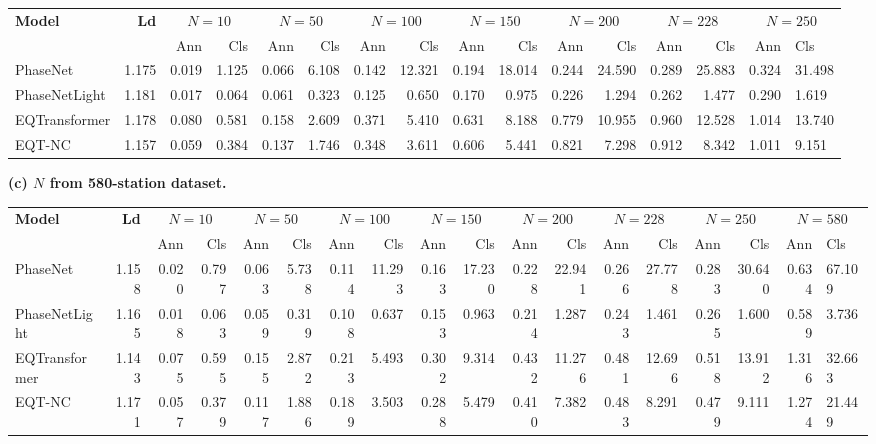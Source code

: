 \begin{landscape}
\begin{center}
\begin{tabular}{l r rrrrrrrrrrrrr}
\toprule
\textbf{Model} & \textbf{Ld} &  &  &  &  &  &  &  \\
 & & Ann & Cls & Ann & Cls & Ann & Cls & Ann & Cls & Ann & Cls & Ann & Cls & Ann & Cls \\
\midrule
PhaseNet & 1.175 & 0.019 & 1.125 & 0.066 & 6.108 & 0.142 & 12.321 & 0.194 & 18.014 & 0.244 & 24.590 & 0.289 & 25.883 & 0.324 & 31.498 \\
PhaseNetLight & 1.181 & 0.017 & 0.064 & 0.061 & 0.323 & 0.125 & 0.650 & 0.170 & 0.975 & 0.226 & 1.294 & 0.262 & 1.477 & 0.290 & 1.619 \\
EQTransformer & 1.178 & 0.080 & 0.581 & 0.158 & 2.609 & 0.371 & 5.410 & 0.631 & 8.188 & 0.779 & 10.955 & 0.960 & 12.528 & 1.014 & 13.740 \\
EQT-NC & 1.157 & 0.059 & 0.384 & 0.137 & 1.746 & 0.348 & 3.611 & 0.606 & 5.441 & 0.821 & 7.298 & 0.912 & 8.342 & 1.011 & 9.151 \\
\bottomrule
\end{tabular}

\vspace{1em}
\textbf{(c) \(N\) from 580-station dataset.}

\begin{tabular}{l r rrrrrrrrrrrrrrr}
\toprule
\textbf{Model} & \textbf{Ld} &  &  &  &  &  &  &  &  \\
 & & Ann & Cls & Ann & Cls & Ann & Cls & Ann & Cls & Ann & Cls & Ann & Cls & Ann & Cls & Ann & Cls \\
\midrule
PhaseNet & 1.158 & 0.020 & 0.797 & 0.063 & 5.738 & 0.114 & 11.293 & 0.163 & 17.230 & 0.228 & 22.941 & 0.266 & 27.778 & 0.283 & 30.640 & 0.634 & 67.109 \\
PhaseNetLight & 1.165 & 0.018 & 0.063 & 0.059 & 0.319 & 0.108 & 0.637 & 0.153 & 0.963 & 0.214 & 1.287 & 0.243 & 1.461 & 0.265 & 1.600 & 0.589 & 3.736 \\
EQTransformer & 1.143 & 0.075 & 0.595 & 0.155 & 2.872 & 0.213 & 5.493 & 0.302 & 9.314 & 0.432 & 11.276 & 0.481 & 12.696 & 0.518 & 13.912 & 1.316 & 32.663 \\
EQT-NC & 1.171 & 0.057 & 0.379 & 0.117 & 1.886 & 0.189 & 3.503 & 0.288 & 5.479 & 0.410 & 7.382 & 0.483 & 8.291 & 0.479 & 9.111 & 1.274 & 21.449 \\
\bottomrule
\end{tabular}
\end{center}

\end{landscape}

